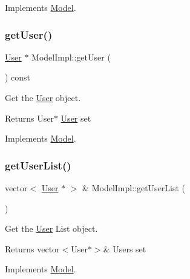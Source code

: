 Implements \hyperlink{classModel_aded51911782e4fa19a79a423482dc561}{Model}.

\mbox{\label{classModelImpl_ac098ad97916ff988d518ded5056dabb0}} 
\subsubsection{\texorpdfstring{get\+User()}{getUser()}}
{\footnotesize\ttfamily \hyperlink{classUser}{User} $\ast$ Model\+Impl\+::get\+User (\begin{DoxyParamCaption}{ }\end{DoxyParamCaption}) const\hspace{0.3cm}{\ttfamily [virtual]}}



Get the \hyperlink{classUser}{User} object. 

\begin{DoxyReturn}{Returns}
User$\ast$ \hyperlink{classUser}{User} set 
\end{DoxyReturn}


Implements \hyperlink{classModel_a20cb9f90df3f8f235dc14fbc13b64167}{Model}.

\mbox{\label{classModelImpl_a46f441c1ba57cc395e6732cab80e78fd}} 
\subsubsection{\texorpdfstring{get\+User\+List()}{getUserList()}}
{\footnotesize\ttfamily vector$<$ \hyperlink{classUser}{User} $\ast$ $>$ \& Model\+Impl\+::get\+User\+List (\begin{DoxyParamCaption}{ }\end{DoxyParamCaption})\hspace{0.3cm}{\ttfamily [virtual]}}



Get the \hyperlink{classUser}{User} List object. 

\begin{DoxyReturn}{Returns}
vector$<$\+User$\ast$$>$\& Users set 
\end{DoxyReturn}


Implements \hyperlink{classModel_a3e27c021561cb19ce48d4a456e75d5ab}{Model}.

